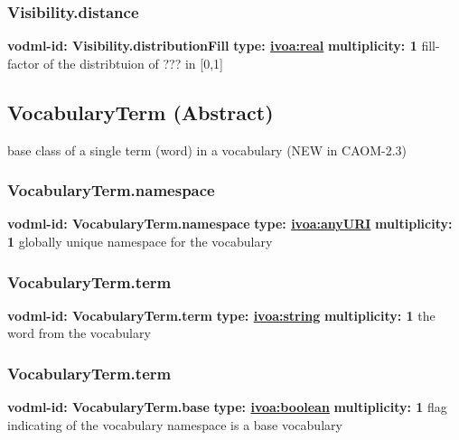     \subsubsection{Visibility.distance}
      \textbf{vodml-id: Visibility.distributionFill} \newline
      \textbf{type: \hyperref[sect:ivoa]{ivoa:real}} \newline
      \textbf{multiplicity: 1} \newline
      fill-factor of the distribtuion of ??? in [0,1]

  \subsection{VocabularyTerm (Abstract)}
  \label{sect:VocabularyTerm}
    base class of a single term (word) in a vocabulary (NEW in CAOM-2.3)

    \subsubsection{VocabularyTerm.namespace}
      \textbf{vodml-id: VocabularyTerm.namespace} \newline
      \textbf{type: \hyperref[sect:ivoa]{ivoa:anyURI}} \newline
      \textbf{multiplicity: 1} \newline
      globally unique namespace for the vocabulary

    \subsubsection{VocabularyTerm.term}
      \textbf{vodml-id: VocabularyTerm.term} \newline
      \textbf{type: \hyperref[sect:ivoa]{ivoa:string}} \newline
      \textbf{multiplicity: 1} \newline
      the word from the vocabulary

    \subsubsection{VocabularyTerm.term}
      \textbf{vodml-id: VocabularyTerm.base} \newline
      \textbf{type: \hyperref[sect:ivoa]{ivoa:boolean}} \newline
      \textbf{multiplicity: 1} \newline
      flag indicating of the vocabulary namespace is a base vocabulary

